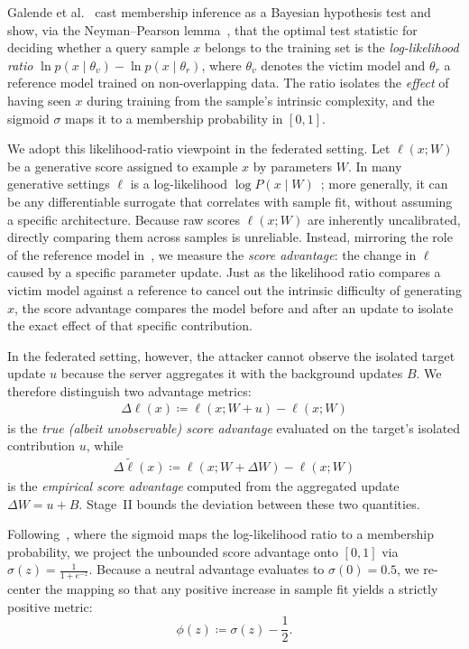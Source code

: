 \documentclass[bdcc,article,submit,pdftex]{Definitions/mdpi}
\newcommand{\utarget}{u}
\begin{document}
Galende et al.~\cite{Galende2025Membership} cast membership inference as a Bayesian hypothesis test and show, via the Neyman--Pearson lemma~\cite{neyman1933ix}, that the optimal test statistic for deciding whether a query sample $x$ belongs to the training set is the \emph{log-likelihood ratio}
$\ln p(x\mid\theta_v)-\ln p(x\mid\theta_r)$,
where $\theta_v$ denotes the victim model and $\theta_r$ a reference model trained on non-overlapping data.
The ratio isolates the \emph{effect} of having seen $x$ during training from the sample's intrinsic complexity, and the sigmoid $\sigma$ maps it to a membership probability in $[0,1]$.

We adopt this likelihood-ratio viewpoint in the federated setting.
Let $\ell(x;W)$ be a generative score assigned to example $x$ by parameters $W$.
In many generative settings $\ell$ is a log-likelihood $\log P(x\mid W)$~\cite{carlini2022membership}; more generally, it can be any differentiable surrogate that correlates with sample fit, without assuming a specific architecture.
Because raw scores $\ell(x;W)$ are inherently uncalibrated, directly comparing them across samples is unreliable.
Instead, mirroring the role of the reference model in~\cite{Galende2025Membership}, we measure the \emph{score advantage}: the change in $\ell$ caused by a specific parameter update.
Just as the likelihood ratio compares a victim model against a reference to cancel out the intrinsic difficulty of generating $x$, the score advantage compares the model before and after an update to isolate the exact effect of that specific contribution.

In the federated setting, however, the attacker cannot observe the isolated target update $\utarget$ because the server aggregates it with the background updates $B$. We therefore distinguish two advantage metrics:
\begin{align}
    \Delta\ell(x) \coloneqq \ell(x;W + \utarget) - \ell(x;W)
\end{align}
is the \emph{true (albeit unobservable) score advantage} evaluated on the target's isolated contribution $\utarget$, while
\begin{align}
    \Delta\tilde\ell(x) \coloneqq \ell(x;W + \Delta W) - \ell(x;W)
\end{align}
is the \emph{empirical score advantage} computed from the aggregated update $\Delta W = \utarget + B$. Stage~II bounds the deviation between these two quantities.

Following~\cite{Galende2025Membership}, where the sigmoid maps the log-likelihood ratio to a membership probability, we project the unbounded score advantage onto $[0,1]$ via $\sigma(z) = \frac{1}{1+e^{-z}}$. Because a neutral advantage evaluates to $\sigma(0)=0.5$, we re-center the mapping so that any positive increase in sample fit yields a strictly positive metric:
\begin{equation}
\label{eq:phi_def}
\phi(z) \coloneqq \sigma(z) - \frac{1}{2}.
\end{equation}
\end{document}
